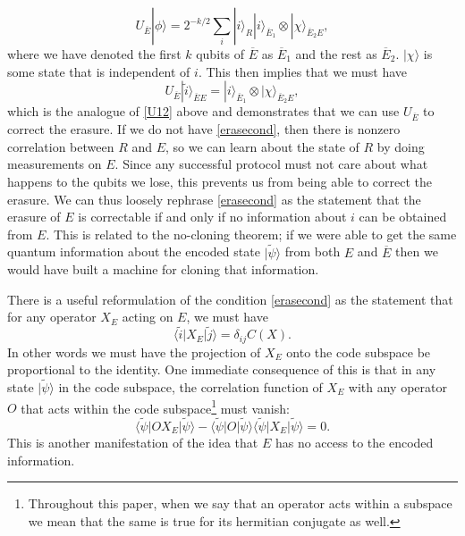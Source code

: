 \documentclass[12pt]{article}
\newcommand{\be}{\begin{equation}}
\newcommand{\ee}{\end{equation}}
\newcommand{\lan}{\langle}
\newcommand{\ran}{\rangle}
\newcommand{\wt}{\widetilde}
\begin{document}
\be
U_{\overline{E}}|\phi\ran=2^{-k/2}\sum_i |i\ran_R|i\ran_{\overline{E}_1}\otimes |\chi\ran_{\overline{E}_2 E},
\ee
where we have denoted the first $k$ qubits of $\overline{E}$ as $\overline{E}_1$ and the rest as $\overline{E}_2$.  $|\chi\ran$ is some state that is independent of $i$.  This then implies that we must have
\be
U_{\overline{E}}|\wt{i}\ran_{\overline{E}E}=|i\ran_{\overline{E}_1}\otimes |\chi\ran_{\overline{E}_2 E},
\ee
which is the analogue of \eqref{U12} above and demonstrates that we can use $U_{\overline{E}}$ to correct the erasure.  If we do not have \eqref{erasecond}, then there is nonzero correlation between $R$ and $E$, so we can learn about the state of $R$ by doing measurements on $E$.  Since any successful protocol must not care about what happens to the qubits we lose, this prevents us from being able to correct the erasure.  We can thus loosely rephrase \eqref{erasecond} as the statement that the erasure of $E$ is correctable if and only if no information about $i$ can be obtained from $E$.  This is related to the no-cloning theorem; if we were able to get the same quantum information about the encoded state $|\wt{\psi}\ran$ from both $E$ and $\overline{E}$ then we would have built a machine for cloning that information.

There is a useful reformulation of the condition \eqref{erasecond} as the statement that for any operator $X_E$ acting on $E$, we must have \cite{grassl1997codes}
\be\label{erasecond2}
\lan \wt{i}|X_E|\wt{j}\ran=\delta_{ij} C(X).
\ee
In other words we must have the projection of $X_E$ onto the code subspace be proportional to the identity.  One immediate consequence of this is that in any state $|\wt{\psi}\ran$ in the code subspace,  the correlation function of $X_E$ with any operator $O$ that acts within the code subspace\footnote{Throughout this paper, when we say that an operator acts within a subspace we mean that the same is true for its hermitian conjugate as well.} must vanish:
\be\label{codecorr}
\lan \wt{\psi}|O X_E|\wt{\psi}\ran-\lan \wt{\psi}|O|\wt{\psi}\ran\lan \wt{\psi}|X_E|\wt{\psi}\ran=0.
\ee
This is another manifestation of the idea that $E$ has no access to the encoded information.  
\end{document}
